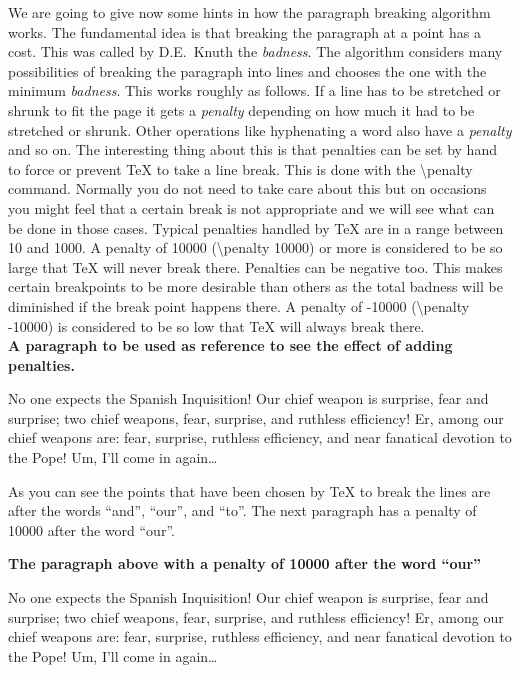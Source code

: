 \documentclass[a4paper]{article}
\newcommand{\bs}[1]{{\rmfamily\color{blue}\textbackslash{}#1}}
\newenvironment{example}[1]{%
\vspace{10pt}
\noindent\textbf{#1}\sffamily\par\vspace{10pt}%
}
{%
\par\vspace{10pt}
}
\begin{document}
We are going to give now some hints in how the paragraph breaking algorithm works. The fundamental idea is that breaking the paragraph at a point has a cost. This was called by D.E.~Knuth the \emph{badness}. The algorithm considers many possibilities of breaking the paragraph into lines and chooses the one with the minimum \emph{badness}. This works roughly as follows. If a line has to be stretched or shrunk to fit the page it gets a \emph{penalty} depending on how much it had to be stretched or shrunk. Other operations like hyphenating a word also have a \emph{penalty} and so on. The interesting thing about this is that penalties can be set by hand to force or prevent \TeX{} to take a line break. This is done with the \bs{penalty} command. Normally you do not need to take care about this but on occasions you might feel that a certain break is not appropriate and we will see what can be done in those cases. Typical penalties handled by \TeX{} are in a range between 10 and 1000. A penalty of 10000  (\bs{penalty 10000}) or more is considered to be so large that \TeX{} will never break there. Penalties can be negative too. This makes certain breakpoints to be more desirable than others as the total badness will be diminished if the break point happens there. A penalty of -10000 (\bs{penalty -10000}) is considered to be so low that \TeX{} will always break there.\\

\begin{example}{A paragraph to be used as reference to see the effect of adding penalties.}
No one expects the Spanish Inquisition! Our chief weapon is surprise, fear and surprise; two chief weapons, fear, surprise, and ruthless efficiency! Er, among our chief weapons are: fear, surprise, ruthless efficiency, and near fanatical devotion to the Pope! Um, I'll come in again\dots
\end{example}

\noindent As you can see the points that have been chosen by \TeX{} to break the lines are after the words ``and'', ``our'', and ``to''. The next paragraph has a penalty of 10000 after the word ``our''.

\begin{example}{The paragraph above with a penalty of 10000 after the word ``our''}
No one expects the Spanish Inquisition! Our chief weapon is surprise, fear and surprise; two chief weapons, fear, surprise, and ruthless efficiency! Er, among our{} chief weapons are: fear, surprise, ruthless efficiency, and near fanatical devotion to the Pope! Um, I'll come in again\dots
\end{example}
\end{document}
